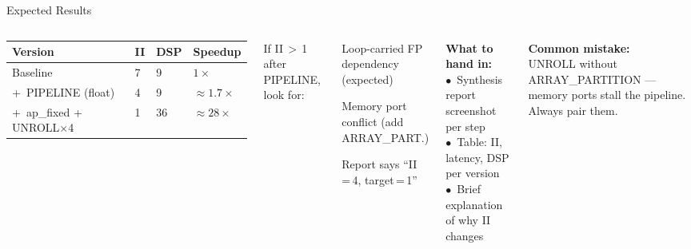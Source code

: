 \documentclass[aspectratio=169,12pt]{beamer}
\begin{document}
\begin{frame}{Expected Results}
\vspace{0.1cm}
\begin{columns}[T,totalwidth=\textwidth]


  \begin{tabular}{lp{0.5cm}p{0.7cm}p{1.0cm}}
    \hline
    \rowcolor{Navy!10}\textbf{Version} & \textbf{II} & \textbf{DSP} & \textbf{Speedup}\\
    \hline
    Baseline             & 7 & 9  & $1\times$\\
    \rowcolor{Navy!5}+\ PIPELINE (float) & 4 & 9  & ${\approx}1.7\times$\\
    +\ ap\_fixed + UNROLL$\times$4   & 1 & 36 & ${\approx}28\times$\\
    \hline
  \end{tabular}

  \vspace{10pt}
  {\small\color{Navy}If II\,$>$\,1 after PIPELINE, look for:}
  \begin{itemize}\setlength{\itemsep}{1pt}
    {\small
    \item Loop-carried FP dependency (expected)
    \item Memory port conflict (add ARRAY\_PART.)
    \item Report says ``II\,=\,4, target\,=\,1''}
  \end{itemize}

  \vspace{0.1cm}

  \colorbox{Teal!10}{\parbox{\dimexpr\linewidth-2\fboxsep\relax}{\vspace{4pt}
    {\color{Teal}\bfseries What to hand in:}\\[3pt]
    {\small
    $\bullet$\ Synthesis report screenshot per step\\[2pt]
    $\bullet$\ Table: II, latency, DSP per version\\[2pt]
    $\bullet$\ Brief explanation of why II changes}
  \vspace{4pt}}}

  \vspace{8pt}
  \colorbox{Orange!10}{\parbox{\dimexpr\linewidth-2\fboxsep\relax}{\vspace{4pt}
    {\color{Orange}\bfseries Common mistake:}\\[2pt]
    {\small UNROLL without ARRAY\_PARTITION ---
    memory ports stall the pipeline. Always pair them.}
  \vspace{4pt}}}

\end{columns}
\end{frame}
\end{document}
